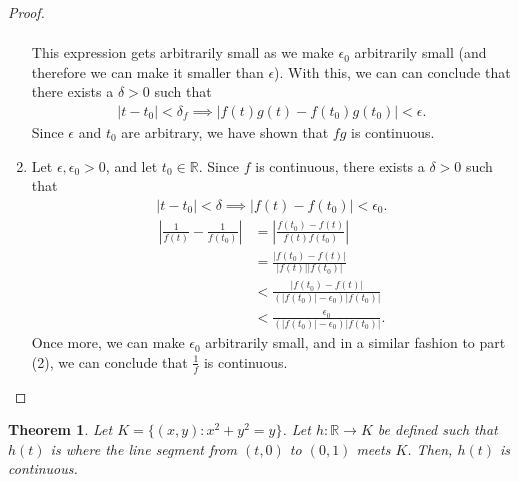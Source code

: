 \documentclass[10pt,a4paper]{article}
\theoremstyle{theorem}
\newtheorem{theorem}{Theorem}
\theoremstyle{definition}
\begin{document}
\begin{proof}
\begin{enumerate}
\begin{align*}
\end{align*}
This expression gets arbitrarily small as we make $\epsilon_0$ arbitrarily small (and therefore we can make it smaller than $\epsilon$).  With this, we can can conclude that there exists a $\delta > 0$ such that
\begin{align*}
|t - t_0| < \delta_f \implies |f(t)g(t) - f(t_0)g(t_0)| < \epsilon.
\end{align*}
Since $\epsilon$ and $t_0$ are arbitrary, we have shown that $fg$ is continuous.
\item Let $\epsilon,\epsilon_0 > 0$, and let $t_0 \in \mathbb{R}$.   Since $f$ is continuous,  there exists a $\delta >0$ such that 
\begin{align*}
|t - t_0| < \delta \implies |f(t) - f(t_0)| < \epsilon_0.
\end{align*}
\begin{align*}
|\frac{1}{f(t)} - \frac{1}{f(t_0)}| &= |\frac{f(t_0) - f(t)}{f(t)f(t_0)}| \\
&= \frac{|f(t_0) - f(t)|}{|f(t)||f(t_0)|} \\
&< \frac{|f(t_0) - f(t)|}{(|f(t_0)| - \epsilon_0)|f(t_0)|} \\
&< \frac{\epsilon_0}{(|f(t_0)| - \epsilon_0)|f(t_0)|}.
\end{align*}
Once more, we can make $\epsilon_0$ arbitrarily small, and in a similar fashion to part (2), we can conclude that $\frac{1}{f}$ is continuous.
\end{enumerate}
\end{proof}

\begin{theorem}
Let $K = \{(x, y): x^2 + y^2 = y \}$. Let $h:\mathbb{R} \to K$ be defined such that $h(t)$ is where the line segment from $(t, 0)$ to $(0, 1)$ meets $K$. Then, $h(t)$ is continuous.
\end{theorem}
\end{document}
